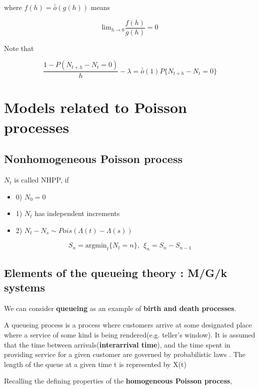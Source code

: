 \documentclass[12pt]{article}
\theoremstyle{nonumberbreak}
\begin{document}
where $f(h) = \bar{\bar{o}} (g(h))$ means

$$
\mathrm{lim}_{h\to0} \frac{f(h)}{g(h)} = 0
$$ 

Note that 

$$
\frac{1 - P(N_{t+h} - N_t = 0) }{h} - \lambda = \bar{\bar{o}} (1) P\{ N_{t+h} - N_t = 0 \}
$$



\pagebreak
\section{Models related to Poisson processes}

\subsection{Nonhomogeneous Poisson process}


$N_t$ is called NHPP, if 

\begin{itemize}
	\item 0) $N_0 = 0$
	\item 1) $N_t$ has independent increments
	\item 2) $N_t - N_s \sim Pois(\Lambda(t) - \Lambda(s))$
\end{itemize}

$$
S_n = \mathrm{argmin}_t \{ N_t =n \}, \ \ \xi_n = S_n - S_{n-1}
$$

\subsection{Elements of the queueing theory : M/G/k systems}

We can consider \textbf{queueing} as an example of \textbf{birth and death processes}. 

A queueing process is a process where customers arrive at some designated place where a service of some kind is being rendered(e.g. teller's window). It is assumed that the time between arrivals(\textbf{interarrival time}), and the time spent in providing service for a given
customer are governed by probabilistic laws . The length of the queue at a
given time t is represented by X(t)


Recalling the defining properties of the \textbf{homogeneous Poisson process}, 
\end{document}
